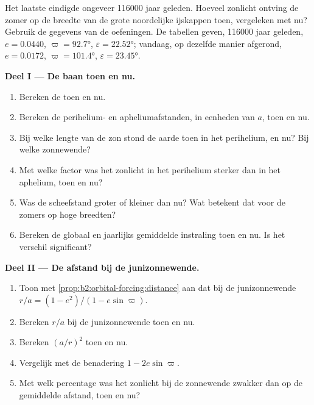 \begin{problem}\label{pb:b2:orbital-forcing:1}
Het laatste  eindigde ongeveer \num{116000} jaar geleden. Hoeveel zonlicht ontving de zomer op de
breedte van de grote noordelijke ijskappen toen, vergeleken met nu? Gebruik de gegevens van de
oefeningen. De tabellen geven, \num{116000} jaar geleden, $e = 0.0440$, $\varpi = \ang{92.7}$,
$\varepsilon = \ang{22.52}$; vandaag, op dezelfde manier afgerond, $e = 0.0172$, $\varpi = \ang{101.4}$,
$\varepsilon = \ang{23.45}$.

\medskip\noindent\textbf{Deel I --- De baan toen en nu.}
\begin{enumerate}
  \item Bereken de  toen en nu.
  \item Bereken de perihelium- en apheliumafstanden, in eenheden van $a$, toen en nu.
  \item Bij welke lengte van de zon stond de aarde toen in het perihelium, en nu? Bij welke zonnewende?
  \item Met welke factor was het zonlicht in het perihelium sterker dan in het aphelium, toen en nu?
  \item Was de scheefstand groter of kleiner dan nu? Wat betekent dat voor de zomers op
        hoge breedten?
  \item Bereken de globaal en jaarlijks gemiddelde instraling toen en nu. Is het verschil significant?
\end{enumerate}

\medskip\noindent\textbf{Deel II --- De afstand bij de junizonnewende.}
\begin{enumerate}[resume]
  \item Toon met \cref{prop:b2:orbital-forcing:distance} aan dat bij de junizonnewende $r/a = (1 -
        e^2)/(1 - e\sin\varpi)$.
  \item Bereken $r/a$ bij de junizonnewende toen en nu.
  \item Bereken $(a/r)^2$ toen en nu.
  \item Vergelijk met de benadering $1 - 2e\sin\varpi$.
  \item Met welk percentage was het zonlicht bij de zonnewende zwakker dan op de gemiddelde afstand, toen en nu?
\end{enumerate}


\end{problem}
